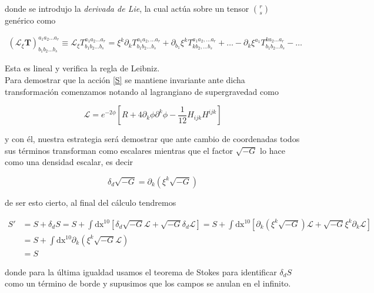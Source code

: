 \documentclass{article}
\numberwithin{equation}{section}
\begin{document}
donde se introdujo la \textit{derivada de Lie}, la cual actúa sobre un tensor $ \binom{r}{s} $ genérico como
	
\begin{equation*}
\begin{aligned}
\left(\mathcal{L}_{\xi}\textbf{T}\right)^{a_1a_2...a_r}_{b_1b_2...b_s} \equiv 
\mathcal{L}_{\xi}T^{a_1a_2...a_r}_{b_1b_2...b_s} = \xi^k \partial_k T^{a_1a_2,...a_r}_{b_1b_2...b_s}
+ \partial_{b_1} \xi^k T^{a_1a_2,...a_r}_{k b_2,...b_s} + \dots - \partial_k \xi^{a_1} T^{k a_2...a_r}_{b_1 b_2...b_s} - \dots
\end{aligned}
\end{equation*}
	
Esta es lineal y verifica la regla de Leibniz.\\

Para demostrar que la acción \ref{S} se mantiene invariante ante dicha transformación comenzamos notando al lagrangiano de supergravedad como

\begin{equation}\label{L}
\mathscr{L}= e^{-2\phi}\left[R + 4 \partial_k \phi\partial^k \phi - \frac{1}{12} H_{i j k}H^{i j k}\right]
\end{equation}

y con él, nuestra estrategia será demostrar que ante cambio de coordenadas todos sus términos transforman como escalares mientras que el factor $\sqrt{-G} $ lo hace como una densidad escalar, es decir

\begin{equation}\label{densidad}
\delta_d \sqrt{-G} = \partial_k \left(\xi^k \sqrt{-G}\right)
\end{equation}

de ser esto cierto, al final del cálculo tendremos

\begin{equation}\label{tegia}
\begin{aligned}
S' &= S + \delta_d S = S + \int\mathrm{dx^{10}} \left[ \delta_d \sqrt{-G} \mathscr{L} + \sqrt{-G} \delta_d \mathscr{L} \right] = S + \int\mathrm{dx^{10}} \left[ \partial_k \left(\xi^k \sqrt{-G}\right) \mathscr{L} + \sqrt{-G} \xi^k \partial_k \mathscr{L} \right]\\
&= S + \int\mathrm{dx^{10}} \partial_k \left( \xi^k \sqrt{-G} \mathscr{L} \right)\\
&= S
\end{aligned}
\end{equation} 

donde para la última igualdad usamos el teorema de Stokes para identificar $ \delta_d S $ como un término de borde y supusimos que los campos se anulan en el infinito.\\
\end{document}
